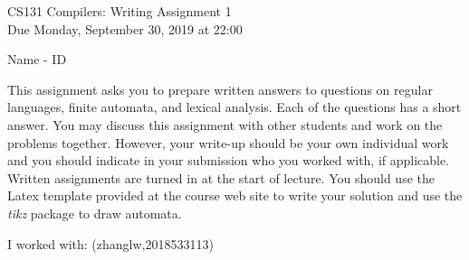 \documentclass[10pt]{article}
\begin{document}
\begin{center}
\Large CS131 Compilers: Writing Assignment 1\\Due Monday, September 30, 2019 at 22:00
\end{center}

\begin{center}
\LARGE Name - ID
\end{center}


This assignment asks you to prepare written answers to questions on
regular languages, finite automata, and lexical analysis.  Each of the
questions has a short answer.  You may discuss this assignment with
other students and work on the problems together.  However, your
write-up should be your own individual work and you should indicate in your submission who you worked
with, if applicable.  Written assignments are turned in at the start of lecture.
You should use the Latex template provided at the course web site to write your solution and use the \emph{tikz} package to draw
automata.

\begin{center}
I worked with: (zhanglw,2018533113)
\end{center}
\end{document}
